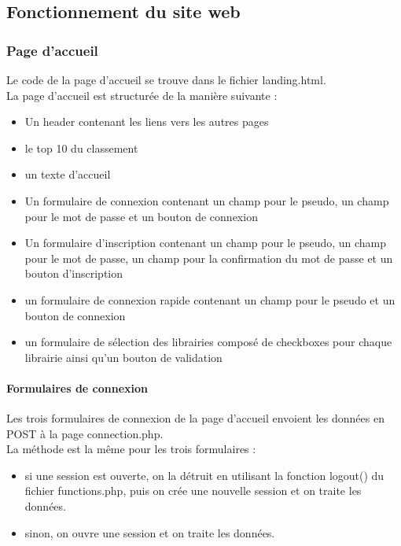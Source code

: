 \documentclass[12pt, openany]{article}
\begin{document}
	\subsection{Fonctionnement du site web}
	\subsubsection{Page d'accueil}
	Le code de la page d'accueil se trouve dans le fichier landing.html.\\
	La page d'accueil est structurée de la manière suivante :
	\begin{itemize}[label=$-$]
		\item Un header contenant les liens vers les autres pages\\
		\item le top 10 du classement\\
		\item un texte d'accueil\\
		\item Un formulaire de connexion contenant un champ pour le pseudo, un champ pour le mot de passe et un bouton de connexion\\
		\item Un formulaire d'inscription contenant un champ pour le pseudo, un champ pour le mot de passe, un champ pour la confirmation du mot de passe et un bouton d'inscription\\
		\item un formulaire de connexion rapide contenant un champ pour le pseudo et un bouton de connexion\\
		\item un formulaire de sélection des librairies composé de checkboxes pour chaque librairie ainsi qu'un bouton de validation\\
	\end{itemize}

	\paragraph{Formulaires de connexion}
	Les trois formulaires de connexion de la page d'accueil envoient les données en POST à la page connection.php.\\
	La méthode est la même pour les trois formulaires :\\
	\begin{itemize}[label=$-$]
		\item si une session est ouverte, on la détruit en utilisant la fonction logout() du fichier functions.php, puis on crée une nouvelle session et on traite les données.\\
		\item sinon, on ouvre une session et on traite les données.\\
	\end{itemize}
\end{document}
